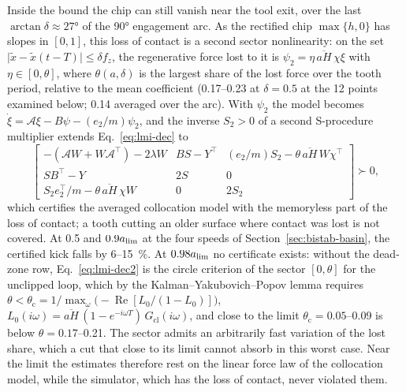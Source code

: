 Inside the bound the chip can still vanish near the tool exit, over the last $\arctan\delta\approx\ang{27}$ of the \ang{90} engagement arc. As the rectified chip $\max\{h,0\}$ has slopes in $[0,1]$, this loss of contact is a second sector nonlinearity: on the set $\lvert\tilde x-\tilde x(t-T)\rvert\le\delta f_z$, the regenerative force lost to it is $\psi_2=\eta\,\overline{aH}\,\chi\xi$ with $\eta\in[0,\theta]$, where $\theta(a,\delta)$ is the largest share of the lost force over the tooth period, relative to the mean coefficient (0.17--0.23 at $\delta=0.5$ at the 12 points examined below; 0.14 averaged over the arc). With $\psi_2$ the model becomes $\dot\xi=\mathcal A\xi-B\psi-(e_2/m)\psi_2$, and the inverse $S_2>0$ of a second S-procedure multiplier extends Eq.~\eqref{eq:lmi-dec} to
\begin{equation}\label{eq:lmi-dec2}
\begin{bmatrix}-(\mathcal AW+W\mathcal A^\top)-2\lambda W & BS-Y^\top & (e_2/m)S_2-\theta\,\overline{aH}\,W\chi^\top\\ SB^\top-Y & 2S & 0\\ S_2e_2^\top/m-\theta\,\overline{aH}\,\chi W & 0 & 2S_2\end{bmatrix}\succ0 ,
\end{equation}
which certifies the averaged collocation model with the memoryless part of the loss of contact; a tooth cutting an older surface where contact was lost is not covered. At 0.5 and $0.9a_{\lim}$ at the four speeds of Section~\ref{sec:bistab-basin}, the certified kick falls by 6--\SI{15}{\percent}. At $0.98a_{\lim}$ no certificate exists: without the dead-zone row, Eq.~\eqref{eq:lmi-dec2} is the circle criterion of the sector $[0,\theta]$ for the unclipped loop, which by the Kalman--Yakubovich--Popov lemma requires $\theta<\theta_{\mathrm{c}}=1/\max_\omega\bigl(-\operatorname{Re}[L_0/(1-L_0)]\bigr)$, $L_0(i\omega)=\overline{aH}\,(1-e^{-i\omega T})\,G_{\mathrm{cl}}(i\omega)$, and close to the limit $\theta_{\mathrm{c}}=0.05$--0.09 is below $\theta=0.17$--0.21. The sector admits an arbitrarily fast variation of the lost share, which a cut that close to its limit cannot absorb in this worst case. Near the limit the estimates therefore rest on the linear force law of the collocation model, while the simulator, which has the loss of contact, never violated them.

